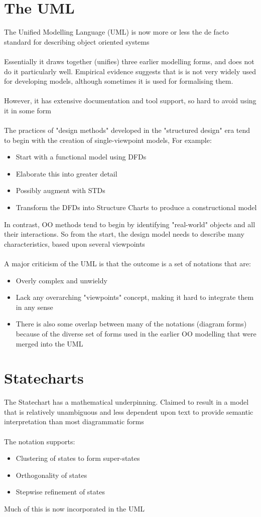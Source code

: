 \documentclass{article}[18pt]
\begin{document}
\section{The UML}
The Unified Modelling Language (UML) is now more or less the de facto standard for describing object oriented systems\\
\\
Essentially it draws together (unifies) three earlier modelling forms, and does not do it particularly well. Empirical evidence suggests that is is not very widely used for developing models, although sometimes it is used for formalising them.\\
\\
However, it has extensive documentation and tool support, so hard to avoid using it in some form\\
\\
The practices of "design methods" developed in the "structured design" era tend to begin with the creation of single-viewpoint models, For example:
\begin{itemize}
	\item Start with a functional model using DFDs
	\item Elaborate this into greater detail
	\item Possibly augment with STDs
	\item Transform the DFDs into Structure Charts to produce a constructional model
\end{itemize}
In contrast, OO methods tend to begin by identifying "real-world" objects and all their interactions. So from the start, the design model needs to describe many characteristics, based upon several viewpoints\\
\\
A major criticism of the UML is that the outcome is a set of notations that are:
\begin{itemize}
	\item Overly complex and unwieldy
	\item Lack any overarching "viewpoints" concept, making it hard to integrate them in any sense
	\item There is also some overlap between many of the notations (diagram forms) because of the diverse set of forms used in the earlier OO modelling that were merged into the UML
\end{itemize}
\section{Statecharts}
The Statechart has a mathematical underpinning. Claimed to result in a model that is relatively unambiguous and less dependent upon text to provide semantic interpretation than most diagrammatic forms\\
\\
The notation supports:
\begin{itemize}
	\item Clustering of states to form super-states
	\item Orthogonality of states
	\item Stepwise refinement of states
\end{itemize}
Much of this is now incorporated in the UML
\end{document}
